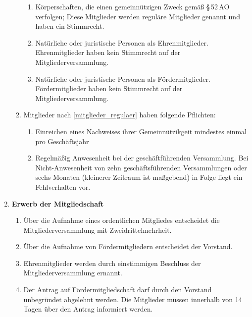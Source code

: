 \documentclass[german]{article}
\newcommand{\paragr}[1]{\item \textsf{\textbf{#1}}}
\begin{document}
\begin{enumerate}
\begin{enumerate}
\begin{enumerate}
\item Körperschaften, die einen gemeinnützigen Zweck gemäß §\,52\,AO verfolgen; Diese Mitglieder werden reguläre Mitglieder genannt und haben ein Stimmrecht. \label{mitglieder_regulaer}

\item Natürliche oder juristische Personen als Ehrenmitglieder. Ehrenmitglieder haben kein Stimmrecht auf der Mitgliederversammlung.

\item Natürliche oder juristische Personen als Fördermitglieder. Fördermitglieder haben kein Stimmrecht auf der Mitgliederversammlung.
\end{enumerate}

\item Mitglieder nach \ref{mitglieder_regulaer} haben folgende Pflichten:

\begin{enumerate}

\item Einreichen eines Nachweises ihrer Gemeinnützikgeit mindestes einmal pro Geschäftsjahr

\item Regelmäßig Anwesenheit bei der geschäftführenden Versammlung. Bei Nicht-Anwesenheit von zehn geschäftsführenden Versammlungen oder sechs Monaten (kleinerer Zeitraum ist maßgebend) in Folge liegt ein Fehlverhalten vor.

\end{enumerate}

\end{enumerate}

\paragr{Erwerb der Mitgliedschaft}
\begin{enumerate}

\item Über die Aufnahme eines ordentlichen Mitgliedes entscheidet die Mitgliederversammlung mit Zweidrittelmehrheit.

\item Über die Aufnahme von Fördermitgliedern entscheidet der Vorstand.

\item Ehrenmitglieder werden durch einstimmigen Beschluss der Mitgliederversammlung ernannt.

\item Der Antrag auf Fördermitgliedschaft darf durch den Vorstand unbegründet abgelehnt werden.
Die Mitglieder müssen innerhalb von 14 Tagen über den Antrag informiert werden.

\end{enumerate}



\end{enumerate}
\end{document}
